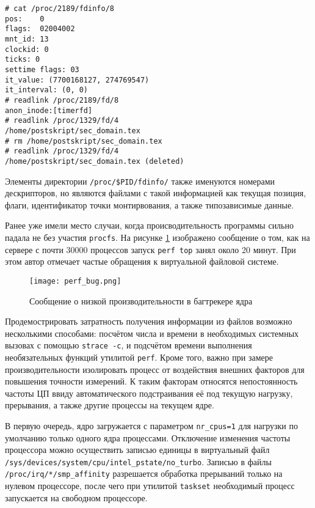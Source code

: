 \medskip
\begin{adjustwidth}{\fivecharsapprox}{}
\begin{lstlisting}[basicstyle=\fontencoding{T1}\small\ttfamily]
# cat /proc/2189/fdinfo/8
pos:    0
flags:  02004002
mnt_id: 13
clockid: 0
ticks: 0
settime flags: 03
it_value: (7700168127, 274769547)
it_interval: (0, 0)
# readlink /proc/2189/fd/8
anon_inode:[timerfd]
# readlink /proc/1329/fd/4
/home/postskript/sec_domain.tex
# rm /home/postskript/sec_domain.tex
# readlink /proc/1329/fd/4
/home/postskript/sec_domain.tex (deleted)
\end{lstlisting}
\end{adjustwidth}
\medskip

Элементы директории \texttt{/proc/\$PID/fdinfo/} также именуются номерами
дескрипторов, но являются файлами с такой информацией как текущая позиция,
флаги, идентификатор точки монтирвования, а также типозависимые данные.

Ранее уже имели место случаи, когда происводительность программы сильно падала
не без участия \texttt{procfs}\cite{slowperf}. На рисунке \ref{fig:perf_bug}
изображено сообщение о том, как на сервере с почти 30000 процессов запуск
\texttt{perf top} занял около 20 минут. При этом автор отмечает частые обращения
к виртуальной файловой системе.

\begin{figure}
  \centering
  \texttt{[image: perf\_bug.png]}
  \caption{Сообщение о низкой производительности в багтрекере ядра \cite{slowperf}}
  \label{fig:perf_bug}
\end{figure}

Продемострировать затратность получения информации из файлов возможно несколькими
способами: посчётом числа и времени в необходимых системных вызовах с помощью
\texttt{strace -c}, и подсчётом времени выполнения необязательных функций
утилитой \texttt{perf}. Кроме того, важно при замере производительности
изолировать процесс от воздействия внешних факторов для повышения точности
измерений. К таким факторам относятся непостоянность частоты ЦП ввиду
автоматического подстраивания её под текущую нагрузку, прерывания, а также
другие процессы на текущем ядре\cite{kernelnewbies}.

В первую очередь, ядро загружается с параметром \texttt{nr\_cpus=1} для нагрузки
по умолчанию только одного ядра процессами\cite{kernel_docs}.
Отключение изменения частоты процессора можно осуществить записью единицы в
виртуальный файл
\texttt{/sys/devices/system/cpu/intel\_pstate/no\_turbo}. Записью в файлы
\texttt{/proc/irq/*/smp\_affinity} разрешается обработка прерываний только на
нулевом процессоре, после чего при утилитой \texttt{taskset} необходимый
процесс запускается на свободном процессоре.

